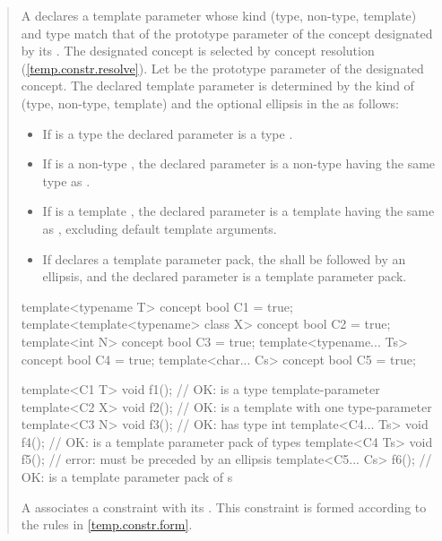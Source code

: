 \begin{quote}
\setcounter{Paras}{8}
\pnum
A  declares a template parameter whose 
kind (type, non-type, template) and type match that of the prototype parameter 
of the concept designated by its .
% 
The designated concept is selected by concept resolution 
(\ref{temp.constr.resolve}).
% 
Let  be the prototype parameter of the designated concept. 
% 
The declared template parameter is determined by the kind of  
(type, non-type, template) and the optional ellipsis in the
 as follows:
% 
\begin{itemize}
\item If  is a type  the declared
parameter is a type . 

\item If  is a non-type , the declared
parameter is a non-type  having the same 
type as .

\item If  is a template , the declared
parameter is a template  having the same 
 as , excluding default template 
arguments.

\item If  declares a template parameter pack, the 
 shall be followed by an ellipsis,
and the declared parameter is a template parameter pack. 
\end{itemize}
% 
\enterexample
\begin{codeblock}
template<typename T> concept bool C1 = true;
template<template<typename> class X> concept bool C2 = true;
template<int N> concept bool C3 = true;
template<typename... Ts> concept bool C4 = true;
template<char... Cs> concept bool C5 = true;

template<C1 T> void f1();     // OK:  is a type template-parameter
template<C2 X> void f2();     // OK:  is a template with one type-parameter
template<C3 N> void f3();     // OK:  has type int
template<C4... Ts> void f4(); // OK:  is a template parameter pack of types
template<C4 Ts> void f5();    // error:  must be preceded by an ellipsis
template<C5... Cs> f6();      // OK:  is a template parameter pack of s
\end{codeblock}
\exitexample

\pnum
A  associates a
constraint with its .
% 
This constraint is formed according to the rules in \ref{temp.constr.form}.
\end{quote}

